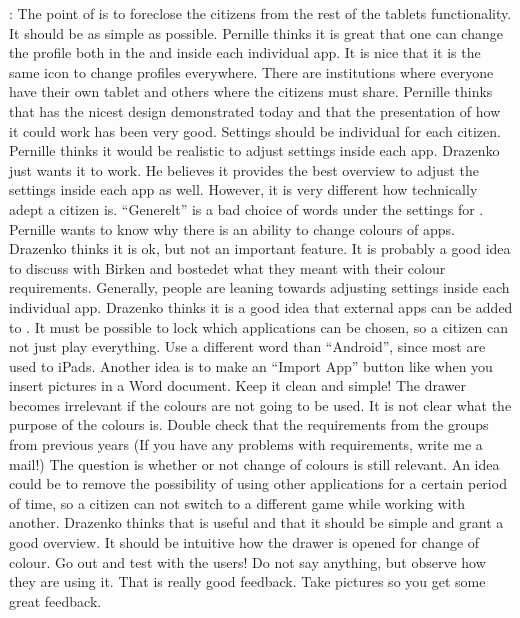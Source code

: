 \launcher: The point of \launcher is to foreclose the citizens from the rest of the tablets functionality.
It should be as simple as possible.
Pernille thinks it is great that one can change the profile both in the \launcher and inside each individual app.
It is nice that it is the same icon to change profiles everywhere.
There are institutions where everyone have their own tablet and others where the citizens must share.
Pernille thinks that \launcher has the nicest design demonstrated today and that the presentation of how it could work has been very good.
Settings should be individual for each citizen.
Pernille thinks it would be realistic to adjust settings inside each app.
Drazenko just wants it to work.
He believes it provides the best overview to adjust the settings inside each app as well.
However, it is very different how technically adept a citizen is.
``Generelt'' is a bad choice of words under the settings for \giraf.
Pernille wants to know why there is an ability to change colours of apps.
Drazenko thinks it is ok, but not an important feature.
It is probably a good idea to discuss with Birken and bostedet what they meant with their colour requirements.
Generally, people are leaning towards adjusting settings inside each individual app.
Drazenko thinks it is a good idea that external apps can be added to \giraf.
It must be possible to lock which applications can be chosen, so a citizen can not just play everything.
Use a different word than ``Android'', since most are used to iPads.
Another idea is to make an ``Import App'' button like when you insert pictures in a Word document.
Keep it clean and simple!
The drawer becomes irrelevant if the colours are not going to be used.
It is not clear what the purpose of the colours is.
Double check that the requirements from the groups from previous years (If you have any problems with requirements, write me a mail!)
The question is whether or not change of colours is still relevant.
An idea could be to remove the possibility of using other applications for a certain period of time, so a citizen can not switch to a different game while working with another.
Drazenko thinks that \launcher is useful and that it should be simple and grant a good overview.
It should be intuitive how the drawer is opened for change of colour.
Go out and test with the users!
Do not say anything, but observe how they are using it. 
That is really good feedback.
Take pictures so you get some great feedback.